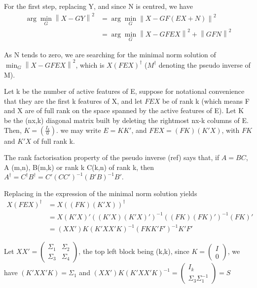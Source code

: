 \documentclass{article}
\begin{document}
For the first step, replacing Y, and since N is centred, we have
\begin{equation}
\begin{aligned}
\arg \min_G \left \| X-GY \right \|^2 &= \arg \min_G \left \| X - GF(EX+N)\right\|^2 \\
&{}= \arg \min_G \left \| X-GFEX\right\| ^2  + \left \| GFN\right \| ^2
\end{aligned}
\end{equation}

As N tends to zero, we are searching for the minimal norm solution of $\min_G \left \| X-GFEX\right\| ^2$, which is $X(FEX)^\dagger$ ($M^\dagger$ denoting the pseudo inverse of M).

Let k be the number of active features of E, suppose for notational convenience that they are the first k features of X, and let $FEX$ be of rank k (which means F and X are of full rank on the space spanned by the active features of E). Let K be the (nx,k) diagonal matrix built by deleting the rightmost nx-k columns of E. Then, $K=(\frac{I_{k}}{0})$. we may write $E=KK'$, and $FEX=(FK)(K'X)$, with $FK$  and $K'X$ of full rank k. 

The rank factorisation property of the pseudo inverse (ref) says that, if $A=BC$, A (m,n), B(m,k) or rank k C(k,n) of rank k, then $A^\dagger=C^\dagger B^\dagger= C' (CC')^{-1}(B'B)^{-1}B'$.

Replacing in the expression of the minimal norm solution yields 
\begin{equation}
\begin{aligned}
X(FEX)^\dagger &=X((FK)(K'X))^\dagger \\
&=X(K'X)'((K'X)(K'X)')^{-1}((FK)(FK)')^{-1}(FK)' \\
&=(XX')K(K'XX'K)^{-1}(FKK'F')^{-1} K'F' 
\end{aligned}
\end{equation}

Let $XX' = \left(\begin{array}{c|c}\Sigma_{1} & \Sigma_{2} \\\hline \Sigma_{3} & \Sigma_{4}\end{array}\right)$, the top left block being (k,k), since $K=\left(\begin{array}{c}I \\\hline 0\end{array}\right)$, we have $(K'XX'K)=\Sigma_{1}$ and $(XX')K(K'XX'K)^{-1}=\left(\begin{array}{c}I_{k} \\\hline \Sigma_{3} \Sigma_{1}^{-1}\end{array}\right)=S$
\end{document}
